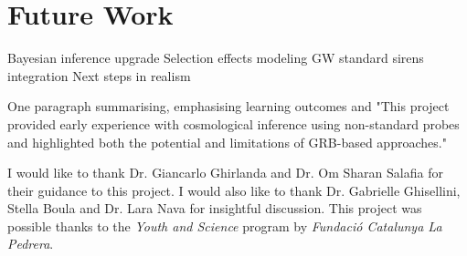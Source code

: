 \documentclass[
    aps,
    prd,
    twocolumn,
    nofootinbib,
    floatfix,
    superscriptaddress
]{revtex4-2}
\begin{document}
\section{Future Work}\label{sec:future}

Bayesian inference upgrade
Selection effects modeling
GW standard sirens integration
Next steps in realism

One paragraph summarising, emphasising learning outcomes and "This project provided early experience with cosmological inference using non-standard probes and highlighted both the potential and limitations of GRB-based approaches."

\begin{acknowledgments}
I would like to thank Dr. Giancarlo Ghirlanda and Dr. Om Sharan Salafia for their guidance to this project. I would also like to thank Dr. Gabrielle Ghisellini, Stella Boula and Dr. Lara Nava for insightful discussion. This project was possible thanks to the \textit{Youth and Science} program by \textit{Fundació Catalunya La Pedrera}. %
\end{acknowledgments}



\end{document}
